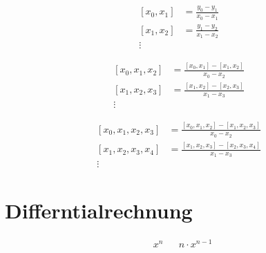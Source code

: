 \begin{shaded}
\begin{minipage}{.5\textwidth}

 \begin{equation}
 \left.\begin{aligned}
  [x_0,x_1]&=\frac{y_0-y_1}{x_0-x_1}\\
  [x_1,x_2]&=\frac{y_1-y_2}{x_1-x_2} \\
\vdots &
 \end{aligned}\right.
\end{equation} 
\end{minipage}\begin{minipage}{.5\textwidth}
 \begin{equation}
 \left.\begin{aligned}
  [x_0,x_1,x_2]&=\frac{[x_0,x_1]-[x_1,x_2]}{x_0-x_2}\\
  [x_1,x_2,x_3]&=\frac{[x_1,x_2]-[x_2,x_3]}{x_1-x_3} \\
\vdots &
 \end{aligned}\right.
\end{equation} 

\end{minipage}\end{shaded}
\begin{shaded}
 \begin{equation}
 \left.\begin{aligned}
  [x_0,x_1,x_2,x_3]&=\frac{[x_0,x_1,x_2]-[x_1,x_2,x_3]}{x_0-x_2}\\
  [x_1,x_2,x_3,x_4]&=\frac{[x_1,x_2,x_3]-[x_2,x_3,x_4]}{x_1-x_3} \\
\vdots &
 \end{aligned}\right.
\end{equation} 
\end{shaded}

\section{Differntialrechnung}

\begin{boxleft}
\end{boxleft}\begin{boxrightshaded}
 \begin{align}
  &x^n& 	&n\cdot x^{n-1}
 \end{align}
\end{boxrightshaded}

